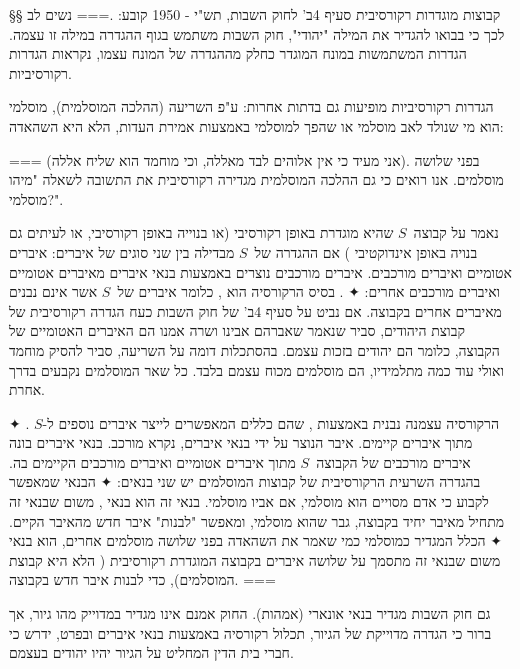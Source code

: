 §§ קבוצות מוגדרות רקורסיבית 
סעיף 4ב' לחוק השבות, תש"י - 1950 קובע:
.===
נשים לב לכך כי בבואו להגדיר את המילה "יהודי", חוק השבות משתמש בגוף ההגדרה במילה
זו עצמה. הגדרות המשתמשות במונח המוגדר כחלק מההגדרה של המונח עצמו, נקראות הגדרות
רקורסיביות.

הגדרות רקורסיביות מופיעות גם בדתות אחרות: ע"פ השריעה (ההלכה המוסלמית), מוסלמי
הוא מי שנולד לאב מוסלמי או שהפך למוסלמי באמצעות אמירת העדות, הלא היא השהאדה:
\begin{Arabic}
\end{Arabic}
===
(אני מעיד כי אין אלוהים לבד מאללה, וכי מוחמד הוא שליח אללה). בפני שלושה
מוסלמים. אנו רואים כי גם ההלכה המוסלמית מגדירה רקורסיבית את התשובה לשאלה "מיהו
מוסלמי?".

נאמר על קבוצה~$S$ שהיא מוגדרת באופן רקורסיבי (או בנוייה באופן רקורסיבי, או
לעיתים גם בנויה באופן אינדוקטיבי ) אם ההגדרה של~$S$ מבדילה בין שני סוגים של
איברים: איברים אטומיים ואיברים מורכבים.
איברים מורכבים נוצרים באמצעות בנאי איברים מאיברים אטומיים ואיברים מורכבים
אחרים:
✦ . בסיס הרקורסיה הוא ,
כלומר איברים של~$S$ אשר אינם נבנים מאיברים אחרים בקבוצה. אם נביט על סעיף 4ב' של
חוק השבות כעח הגדרה רקורסיבית של קבוצת היהודים, סביר שנאמר שאברהם אבינו ושרה
אמנו הם האיברים האטומיים של הקבוצה, כלומר הם יהודים בזכות עצמם. בהסתכלות דומה
על השריעה, סביר להסיק מוחמד ואולי עוד כמה מתלמידיו, הם מוסלמים מכוח עצמם בלבד.
כל שאר המוסלמים נקבעים בדרך אחרת.

✦ . הרקורסיה עצמנה נבנית באמצעות , שהם כללים
המאפשרים לייצר איברים נוספים ל-$S$ מתוך איברים קיימים. איבר הנוצר על ידי בנאי
איברים, נקרא מורכב. בנאי איברים בונה איברים מורכבים של הקבוצה~$S$ מתוך איברים
אטומיים ואיברים מורכבים הקיימים בה. בהגדרה השרעית הרקורסיבית של קבוצות
המוסלמים יש שני בנאים:
✦ הבנאי שמאפשר לקבוע כי אדם מסויים הוא מוסלמי, אם אביו מוסלמי. בנאי זה הוא בנאי
, משום שבנאי זה מתחיל מאיבר יחיד בקבוצה, גבר שהוא מוסלמי, ומאפשר
"לבנות" איבר חדש מהאיבר הקיים.
✦ הכלל המגדיר כמוסלמי כמי שאמר את השהאדה בפני שלושה מוסלמים אחרים, הוא בנאי
 משום שבנאי זה מתסמך על שלושה איברים בקבוצה המוגדרת רקורסיבית (
הלא היא קבוצת המוסלמים), כדי לבנות איבר חדש בקבוצה.
===

גם חוק השבות מגדיר בנאי אונארי (אמהות). החוק אמנם אינו מגדיר
במדוייק מהו גיור, אך ברור כי הגדרה מדוייקת של הגיור, תכלול רקורסיה באמצעות בנאי
איברים ובפרט, ידרש כי חברי בית הדין המחליט על הגיור יהיו יהודים בעצמם.

